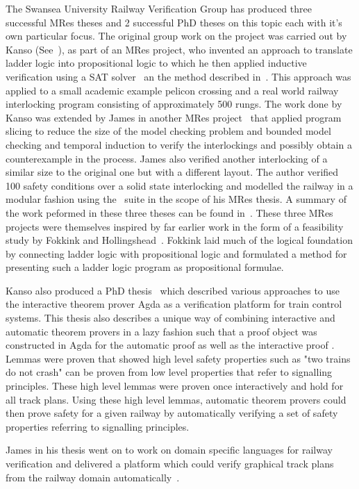 The Swansea University Railway Verification Group has produced three successful MRes theses and 2 successful PhD theses on this topic each with it's own particular focus. The original group work on the project was carried out by Kanso (See~\cite{KK08}), as part of an MRes project,  who invented an approach to translate ladder logic into propositional logic to which he then applied inductive verification using a SAT solver~\cite{KK09} an the method described in~\cite{MS00}. This approach was applied to a small academic example pelicon crossing and a real world railway interlocking program consisting of approximately 500 rungs. The work done by Kanso was extended by James in another MRes project~\cite{PJ10} that applied program slicing to reduce the size of the model checking problem and bounded model checking and temporal induction to verify the interlockings and possibly obtain a counterexample in the process. James also verified another interlocking of a similar size to the original one but with a different layout. The author verified 100 safety conditions over a solid state interlocking and modelled the railway in a modular fashion using the  \scade \, suite in the scope of his MRes thesis. A summary of the work peformed in these three theses can be found in~\cite{AL14a}. These three MRes projects were themselves inspired by far earlier work in the form of a feasibility study by Fokkink and Hollingshead~\cite{WF98}. Fokkink laid much of the logical foundation by connecting ladder logic with propositional logic and formulated a method for presenting such a ladder logic program as propositional formulae.

Kanso also produced a PhD thesis~\cite{KarimPhD} which described various approaches to use the interactive theorem prover Agda as a verification platform for train control systems. This thesis also describes a unique way of combining interactive and automatic theorem provers in a lazy fashion such that a proof object was constructed in Agda for the automatic proof as well as the interactive proof \cite{KarimPaper}. Lemmas were proven that showed high level safety properties such as "two trains do not crash" can be proven from low level properties that refer to  signalling principles. These high level lemmas were proven once interactively and hold for all track plans. Using these high level lemmas, automatic theorem provers could then prove safety for a given railway by automatically verifying a set of safety properties referring to signalling principles.

James in his thesis went on to work on domain specific languages for railway verification and delivered a platform which could verify graphical track plans from the railway domain automatically~\cite{PhilPhD}.

